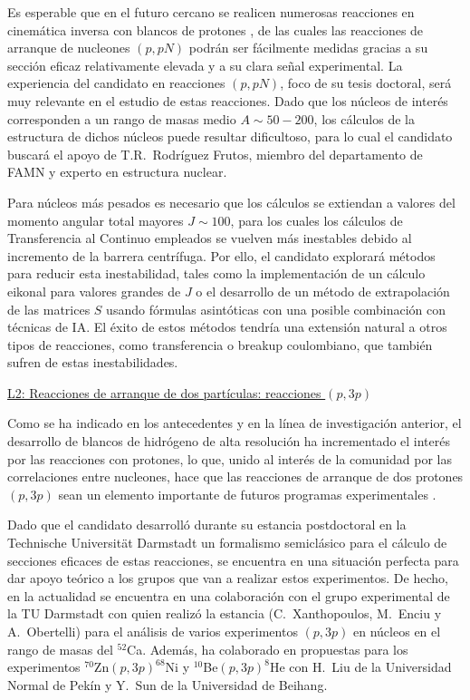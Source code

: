 \documentclass[a4paper,12pt,twoside]{article}
\begin{document}
Es esperable que en el futuro cercano se realicen numerosas reacciones en cinemática inversa con blancos de protones \cite{r3b24,onokoro}, de las cuales las reacciones de arranque de nucleones $(p,pN)$ podrán ser fácilmente medidas gracias a su sección eficaz relativamente elevada y a su clara señal experimental. La experiencia del candidato en reacciones $(p,pN)$, foco de su tesis doctoral, será muy relevante en el estudio de estas reacciones. Dado que los núcleos de interés corresponden a un rango de masas medio $A\sim 50-200$, los cálculos de la estructura de dichos núcleos puede resultar dificultoso, para lo cual el candidato buscará el apoyo de T.R.~Rodríguez Frutos, miembro del departamento de FAMN y experto en estructura nuclear.

Para núcleos más pesados es necesario que los cálculos se extiendan a valores del momento angular total mayores $J\sim 100$, para los cuales los cálculos de Transferencia al Continuo empleados se vuelven más inestables debido al incremento de la barrera centrífuga. Por ello, el candidato explorará métodos para reducir esta inestabilidad, tales como la implementación de un cálculo eikonal para valores grandes de $J$ o el desarrollo de un método de extrapolación de las matrices $S$ usando fórmulas asintóticas con una posible combinación con técnicas de IA. El éxito de estos métodos tendría una extensión natural a otros tipos de reacciones, como transferencia o breakup coulombiano, que también sufren de estas inestabilidades.

\underline{L2: Reacciones de arranque de dos partículas: reacciones $(p,3p)$}

Como se ha indicado en los antecedentes y en la línea de investigación anterior, el desarrollo de blancos de hidrógeno de alta resolución ha incrementado el interés por las reacciones con protones, lo que, unido al interés de la comunidad por las correlaciones entre nucleones, hace que las reacciones de arranque de dos protones $(p,3p)$ sean un elemento importante de futuros programas experimentales \cite{onokoro}.

Dado que el candidato desarrolló durante su estancia postdoctoral en la Technische Universität Darmstadt un formalismo semiclásico para el cálculo de secciones eficaces de estas reacciones, se encuentra en una situación perfecta para dar apoyo teórico a los grupos que van a realizar estos experimentos. De hecho, en la actualidad se encuentra en una colaboración con el grupo experimental de la TU Darmstadt con quien realizó la estancia (C.~Xanthopoulos, M.~Enciu y A.~Obertelli) para el análisis de varios experimentos $(p,3p)$ en núcleos en el rango de masas del $^{52}$Ca. Además, ha colaborado en propuestas para los experimentos $^{70}$Zn$(p,3p)^{68}$Ni y $^{10}$Be$(p,3p)^8$He con H.~Liu de la Universidad Normal de Pekín y Y.~Sun de la Universidad de Beihang.
\end{document}
